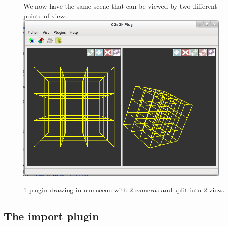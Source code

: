 \documentclass[a4paper]{scrreprt}
\begin{document}
	\begin{figure}[h!p]
	We now have the same scene that can be viewed by two different points of
	view.\\
	  \centering
	    \includegraphics[width=0.95\textwidth]{images/screenshot12}
	  \caption{1 plugin drawing in one scene with 2 cameras and split into 2
	  view.}
	  \label{fig:tuto5GeomDoubleView}
	\end{figure}
	
	\FloatBarrier
\subsection{The import plugin}
\end{document}

